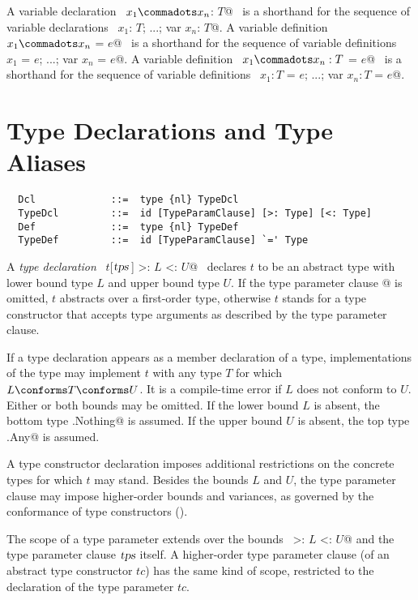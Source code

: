A variable declaration ~\lstinline@var $x_1 \commadots x_n$: $T$@~
is a
shorthand for the sequence of variable declarations
~\lstinline@var $x_1$: $T$; ...; var $x_n$: $T$@.
A variable definition ~\lstinline@var $x_1 \commadots x_n$ = $e$@~
is a
shorthand for the sequence of variable definitions
~\lstinline@var $x_1$ = $e$; ...; var $x_n$ = $e$@.
A variable definition ~\lstinline@var $x_1 \commadots x_n: T$ = $e$@~
is a
shorthand for the sequence of variable definitions
~\lstinline@var $x_1: T$ = $e$; ...; var $x_n: T$ = $e$@.

\section{Type Declarations and Type Aliases}
\label{sec:typedcl}
\label{sec:typealias}

\syntax\begin{lstlisting}
  Dcl             ::=  type {nl} TypeDcl
  TypeDcl         ::=  id [TypeParamClause] [>: Type] [<: Type]
  Def             ::=  type {nl} TypeDef
  TypeDef         ::=  id [TypeParamClause] `=' Type
\end{lstlisting}

A {\em type declaration} ~\lstinline@type $t$[$\tps\,$] >: $L$ <: $U$@~ declares
$t$ to be an abstract type with lower bound type $L$ and upper bound
type $U$. If the type parameter clause \lstinline@[$\tps\,$]@ is omitted, $t$ abstracts over a first-order type, otherwise $t$ stands for a type constructor that accepts type arguments as described by the type parameter clause.

If a type declaration appears as a member declaration of a
type, implementations of the type may implement $t$ with any type $T$
for which $L \conforms T \conforms U$. It is a compile-time error if
$L$ does not conform to $U$.  Either or both bounds may be omitted.
If the lower bound $L$ is absent, the bottom type
\lstinline@scala.Nothing@ is assumed.  If the upper bound $U$ is absent,
the top type \lstinline@scala.Any@ is assumed.

A type constructor declaration imposes additional restrictions on the concrete types for which $t$ may stand. Besides the bounds $L$ and $U$, the type parameter clause may impose higher-order bounds and variances, as governed by the conformance of type constructors ().

The scope of a type parameter extends over the bounds ~\lstinline@>: $L$ <: $U$@ and the type parameter clause $\mbox{\sl tps}$ itself. A higher-order type parameter clause (of an abstract type constructor $tc$) has the same kind of scope, restricted to the declaration of the type parameter $tc$. 

